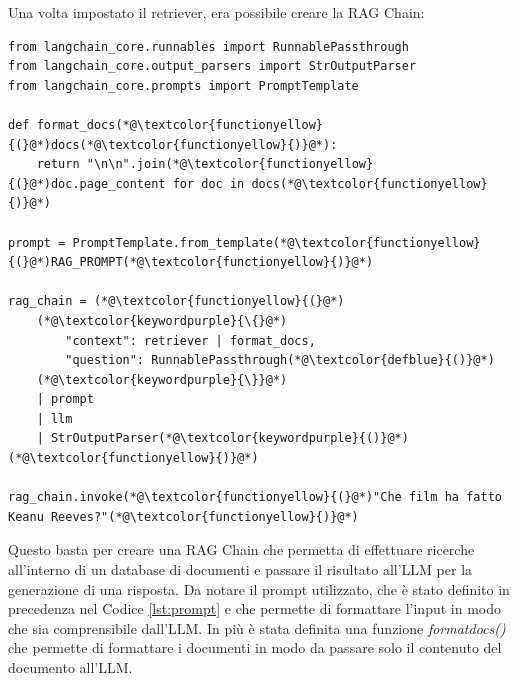 Una volta impostato il retriever, era possibile creare la RAG Chain:
\begin{lstlisting}[label=lst:ragchain, caption={Creazione della RAG Chain}]
from langchain_core.runnables import RunnablePassthrough
from langchain_core.output_parsers import StrOutputParser
from langchain_core.prompts import PromptTemplate

def format_docs(*@\textcolor{functionyellow}{(}@*)docs(*@\textcolor{functionyellow}{)}@*):
    return "\n\n".join(*@\textcolor{functionyellow}{(}@*)doc.page_content for doc in docs(*@\textcolor{functionyellow}{)}@*)

prompt = PromptTemplate.from_template(*@\textcolor{functionyellow}{(}@*)RAG_PROMPT(*@\textcolor{functionyellow}{)}@*)

rag_chain = (*@\textcolor{functionyellow}{(}@*)
    (*@\textcolor{keywordpurple}{\{}@*)
        "context": retriever | format_docs,
        "question": RunnablePassthrough(*@\textcolor{defblue}{()}@*)
    (*@\textcolor{keywordpurple}{\}}@*)
    | prompt
    | llm
    | StrOutputParser(*@\textcolor{keywordpurple}{()}@*)
(*@\textcolor{functionyellow}{)}@*)

rag_chain.invoke(*@\textcolor{functionyellow}{(}@*)"Che film ha fatto Keanu Reeves?"(*@\textcolor{functionyellow}{)}@*)
\end{lstlisting}
Questo basta per creare una RAG Chain che permetta di effettuare ricerche all'interno di un database di documenti e passare il risultato all'LLM per la generazione di una risposta. Da notare il prompt utilizzato, che è stato definito in precedenza nel Codice \ref{lst:prompt} e che permette di formattare l'input in modo che sia comprensibile dall'LLM. In più è stata definita una funzione \textit{format\textunderscore docs()} che permette di formattare i documenti in modo da passare solo il contenuto del documento all'LLM.

